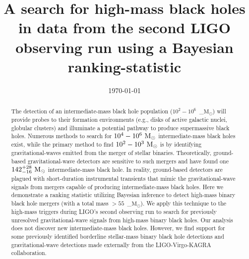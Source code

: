 \documentclass[%
 nofootinbib,
 amsmath,amssymb,
 aps,
 twocolumn,
 superscriptaddress
]{revtex4-2}
\newcommand{\mathcmd}[1]{{\sc \relax\ifmmode#1\else $#1$\fi}\xspace}
\newcommand{\msun}{\mathcmd{\text{M}_\odot}}
\begin{document}
\title{A search for high-mass black holes in data from the second LIGO observing run using a Bayesian ranking-statistic}




\date{\today}


\begin{abstract}
The detection of an intermediate-mass black hole population ($10^2-10^6$~\msun) will provide probes to their formation environments (e.g., disks of active galactic nuclei, globular clusters) and illuminate a potential pathway to produce supermassive black holes. Numerous methods to search for $10^4-10^6\ \msun$ intermediate-mass black holes exist, while the primary method to find $10^2-10^3\ \msun$ is by identifying gravitational-waves emitted from the merger of stellar binaries. Theoretically, ground-based gravitational-wave detectors are sensitive to such mergers and have found one $142^{+28}_{-16}\ \msun$ intermediate-mass black hole. In reality, ground-based detectors are plagued with short-duration instrumental transients that mimic the gravitational-wave signals from mergers capable of producing intermediate-mass black holes. Here we demonstrate a ranking statistic utilizing Bayesian inference to detect high-mass binary black hole mergers (with a total mass $>55$~\msun). We apply this technique to the high-mass triggers during LIGO's second observing run to search for previously unresolved gravitational-wave signals from high-mass binary black holes. Our analysis does not discover new intermediate-mass black holes. However, we find support for some previously identified borderline stellar-mass binary black hole detections and gravitational-wave detections made externally from the LIGO-Virgo-KAGRA collaboration.
\end{abstract}


\maketitle

\end{document}
